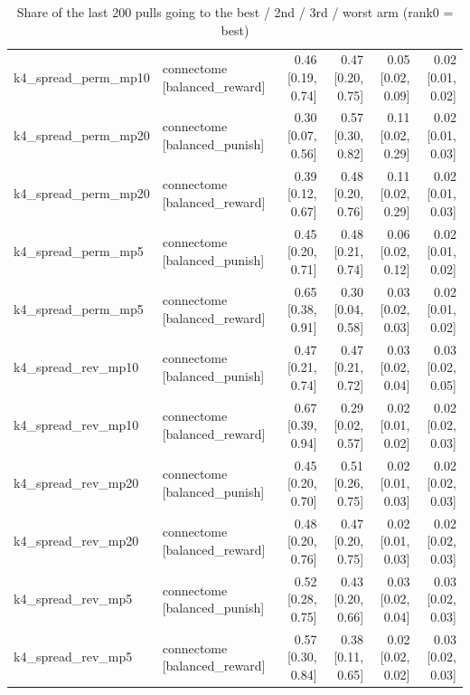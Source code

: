 \begin{table}[t]
\begin{tabular}{llrrrr}
k4\_spread\_perm\_mp10 & connectome [balanced\_reward] & 0.46 [0.19, 0.74] & 0.47 [0.20, 0.75] & 0.05 [0.02, 0.09] & 0.02 [0.01, 0.02] \\
k4\_spread\_perm\_mp20 & connectome [balanced\_punish] & 0.30 [0.07, 0.56] & 0.57 [0.30, 0.82] & 0.11 [0.02, 0.29] & 0.02 [0.01, 0.03] \\
k4\_spread\_perm\_mp20 & connectome [balanced\_reward] & 0.39 [0.12, 0.67] & 0.48 [0.20, 0.76] & 0.11 [0.02, 0.29] & 0.02 [0.01, 0.03] \\
k4\_spread\_perm\_mp5 & connectome [balanced\_punish] & 0.45 [0.20, 0.71] & 0.48 [0.21, 0.74] & 0.06 [0.02, 0.12] & 0.02 [0.01, 0.02] \\
k4\_spread\_perm\_mp5 & connectome [balanced\_reward] & 0.65 [0.38, 0.91] & 0.30 [0.04, 0.58] & 0.03 [0.02, 0.03] & 0.02 [0.01, 0.02] \\
k4\_spread\_rev\_mp10 & connectome [balanced\_punish] & 0.47 [0.21, 0.74] & 0.47 [0.21, 0.72] & 0.03 [0.02, 0.04] & 0.03 [0.02, 0.05] \\
k4\_spread\_rev\_mp10 & connectome [balanced\_reward] & 0.67 [0.39, 0.94] & 0.29 [0.02, 0.57] & 0.02 [0.01, 0.02] & 0.02 [0.02, 0.03] \\
k4\_spread\_rev\_mp20 & connectome [balanced\_punish] & 0.45 [0.20, 0.70] & 0.51 [0.26, 0.75] & 0.02 [0.01, 0.03] & 0.02 [0.02, 0.03] \\
k4\_spread\_rev\_mp20 & connectome [balanced\_reward] & 0.48 [0.20, 0.76] & 0.47 [0.20, 0.75] & 0.02 [0.01, 0.03] & 0.02 [0.02, 0.03] \\
k4\_spread\_rev\_mp5 & connectome [balanced\_punish] & 0.52 [0.28, 0.75] & 0.43 [0.20, 0.66] & 0.03 [0.02, 0.04] & 0.03 [0.02, 0.03] \\
k4\_spread\_rev\_mp5 & connectome [balanced\_reward] & 0.57 [0.30, 0.84] & 0.38 [0.11, 0.65] & 0.02 [0.02, 0.02] & 0.03 [0.02, 0.03] \\
\bottomrule
\end{tabular}
\caption{Share of the last 200 pulls going to the best / 2nd / 3rd / worst arm (rank0 = best)}
\label{tab:bandit_punish_choice_share}
\end{table}